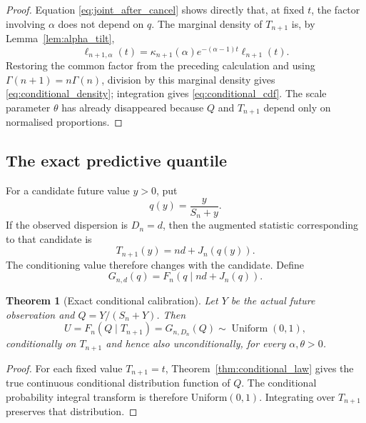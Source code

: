 \documentclass[11pt]{article}
\newtheorem{theorem}{Theorem}[section]
\theoremstyle{remark}
\begin{document}
\begin{proof}
Equation \eqref{eq:joint_after_cancel} shows directly that, at fixed $t$, the factor involving $\alpha$ does not depend on $q$. The marginal density of $T_{n+1}$ is, by Lemma~\ref{lem:alpha_tilt},
\[
 \ell_{n+1,\alpha}(t)
 =\kappa_{n+1}(\alpha)e^{-(\alpha-1)t}\ell_{n+1}(t).
\]
Restoring the common factor from the preceding calculation and using $\Gamma(n+1)=n\Gamma(n)$, division by this marginal density gives \eqref{eq:conditional_density}; integration gives \eqref{eq:conditional_cdf}. The scale parameter $\theta$ has already disappeared because $Q$ and $T_{n+1}$ depend only on normalised proportions.
\end{proof}

\subsection{The exact predictive quantile}

For a candidate future value $y>0$, put
\begin{equation}
 q(y)=\frac{y}{S_n+y}.
 \label{eq:q_candidate}
\end{equation}
If the observed dispersion is $D_n=d$, then the augmented statistic corresponding to that candidate is
\begin{equation}
 T_{n+1}(y)=nd+J_n(q(y)).
 \label{eq:t_candidate}
\end{equation}
The conditioning value therefore changes with the candidate. Define
\begin{equation}
 G_{n,d}(q)=F_n(q\mid nd+J_n(q)).
 \label{eq:G}
\end{equation}

\begin{theorem}[Exact conditional calibration]
\label{thm:pit}
Let $Y$ be the actual future observation and $Q=Y/(S_n+Y)$. Then
\begin{equation}
 U=F_n(Q\mid T_{n+1})=G_{n,D_n}(Q)\sim\operatorname{Uniform}(0,1),
 \label{eq:uniform_pit}
\end{equation}
conditionally on $T_{n+1}$ and hence also unconditionally, for every $\alpha,\theta>0$.
\end{theorem}

\begin{proof}
For each fixed value $T_{n+1}=t$, Theorem~\ref{thm:conditional_law} gives the true continuous conditional distribution function of $Q$. The conditional probability integral transform is therefore Uniform$(0,1)$. Integrating over $T_{n+1}$ preserves that distribution.
\end{proof}
\end{document}
